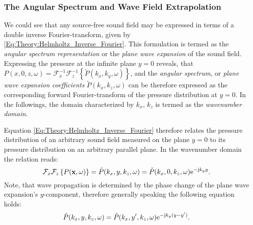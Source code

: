 \subsubsection{The Angular Spectrum and Wave Field Extrapolation}
We could see that any source-free sound field may be expressed in terms of a double inverse Fourier-transform, given by \eqref{Eq:Theory:Helmholtz_Inverse_Fourier}.
This formulation is termed as the \emph{angular spectrum representation} \cite{Ahrens2010phd, Ahrens2012, Williams1999} or the \emph{plane wave expansion} \cite{Spors2005} of the sound field.
Expressing the pressure at the infinite plane $y=0$ reveals, that $P(x,0,z,\omega) = \mathcal{F}_x^{-1}\mathcal{F}_z^{-1} \left\{\tilde{P}(k_x,k_y, \omega)\right\}$,
and the \emph{angular spectrum}, or \emph{plane wave expansion coefficients} $\tilde{P}(k_x,k_z, \omega)$ can be therefore expressed as the corresponding forward Fourier-transform of the pressure distribution at $y=0$.
In the followings, the domain characterized by $k_x$, $k_z$ is termed as the \emph{wavenumber domain}.

Equation \eqref{Eq:Theory:Helmholtz_Inverse_Fourier} therefore relates the pressure distribution of an arbitrary sound field measured on the plane $y=0$ to its pressure distribution on an arbitrary parallel plane. In the wavenumber domain the relation reads:
\begin{equation}
\mathcal{F}_x\mathcal{F}_z \left\{ P(\mathbf{x},\omega) \right\} = \tilde{P}(k_x,y,k_z,\omega) = \tilde{P}(k_x,0,k_z,\omega) \mathrm{e}^{-\mathrm{j} k_y y}.
\label{Eq:Theory:Wave_field_extrapolation}
\end{equation}
Note, that wave propagation is determined by the phase change of the plane wave expansion's $y$-component, therefore generally speaking the following equation holds:
\begin{equation}
\tilde{P}(k_x,y,k_z,\omega) = \tilde{P}(k_x,y',k_z,\omega) \mathrm{e}^{-\mathrm{j} k_y ( y - y' ) }.
\end{equation}

